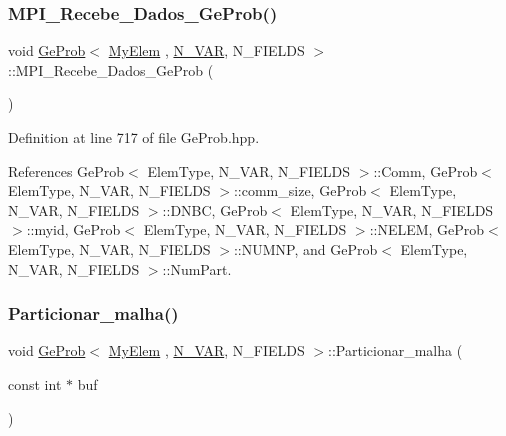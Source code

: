 \subsubsection{\texorpdfstring{M\+P\+I\+\_\+\+Recebe\+\_\+\+Dados\+\_\+\+Ge\+Prob()}{MPI\_Recebe\_Dados\_GeProb()}}
{\footnotesize\ttfamily void \hyperlink{classGeProb}{Ge\+Prob}$<$ \hyperlink{DG__Prob_8h_a83cd887ced9a6587428f267e50cd4787}{My\+Elem} , \hyperlink{classED__Prob_a4e7d2ff1a8e435e336fb00c527224b5a}{N\+\_\+\+V\+AR}, N\+\_\+\+F\+I\+E\+L\+DS $>$\+::M\+P\+I\+\_\+\+Recebe\+\_\+\+Dados\+\_\+\+Ge\+Prob (\begin{DoxyParamCaption}{ }\end{DoxyParamCaption})\hspace{0.3cm}{\ttfamily [inherited]}}



Definition at line 717 of file Ge\+Prob.\+hpp.



References Ge\+Prob$<$ Elem\+Type, N\+\_\+\+V\+A\+R, N\+\_\+\+F\+I\+E\+L\+D\+S $>$\+::\+Comm, Ge\+Prob$<$ Elem\+Type, N\+\_\+\+V\+A\+R, N\+\_\+\+F\+I\+E\+L\+D\+S $>$\+::comm\+\_\+size, Ge\+Prob$<$ Elem\+Type, N\+\_\+\+V\+A\+R, N\+\_\+\+F\+I\+E\+L\+D\+S $>$\+::\+D\+N\+BC, Ge\+Prob$<$ Elem\+Type, N\+\_\+\+V\+A\+R, N\+\_\+\+F\+I\+E\+L\+D\+S $>$\+::myid, Ge\+Prob$<$ Elem\+Type, N\+\_\+\+V\+A\+R, N\+\_\+\+F\+I\+E\+L\+D\+S $>$\+::\+N\+E\+L\+EM, Ge\+Prob$<$ Elem\+Type, N\+\_\+\+V\+A\+R, N\+\_\+\+F\+I\+E\+L\+D\+S $>$\+::\+N\+U\+M\+NP, and Ge\+Prob$<$ Elem\+Type, N\+\_\+\+V\+A\+R, N\+\_\+\+F\+I\+E\+L\+D\+S $>$\+::\+Num\+Part.

\mbox{\label{classGeProb_ac439ec4e4198924d385d8948edb20708}} 
\subsubsection{\texorpdfstring{Particionar\+\_\+malha()}{Particionar\_malha()}}
{\footnotesize\ttfamily void \hyperlink{classGeProb}{Ge\+Prob}$<$ \hyperlink{DG__Prob_8h_a83cd887ced9a6587428f267e50cd4787}{My\+Elem} , \hyperlink{classED__Prob_a4e7d2ff1a8e435e336fb00c527224b5a}{N\+\_\+\+V\+AR}, N\+\_\+\+F\+I\+E\+L\+DS $>$\+::Particionar\+\_\+malha (\begin{DoxyParamCaption}\item[{const int $\ast$}]{buf }\end{DoxyParamCaption})\hspace{0.3cm}{\ttfamily [inherited]}}



